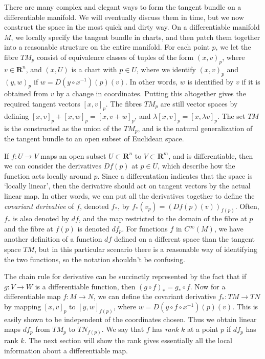 There are many complex and elegant ways to form the tangent bundle on a differentiable manifold. We will eventually discuss them in time, but we now construct the space in the most quick and dirty way. On a differentiable manifold $M$, we locally specify the tangent bundle in charts, and then patch them together into a reasonable structure on the entire manifold. For each point $p$, we let the fibre $TM_p$ consist of equivalence classes of tuples of the form $(x,v)_p$, where $v \in \mathbf{R}^n$, and $(x,U)$ is a chart with $p \in U$, where we identify $(x,v)_p$ and $(y,w)_p$ if $w = D(y \circ x^{-1})(p)(v)$. In other words, $w$ is identified by $v$ if it is obtained from $v$ by a change in coordinates. Putting this altogether gives the required tangent vectors $[x,v]_p$. The fibres $TM_p$ are still vector spaces by defining $[x,v]_p + [x,w]_p = [x,v+w]_p$, and $\lambda [x,v]_p = [x,\lambda v]_p$. The set $TM$ is the constructed as the union of the $TM_p$, and is the natural generalization of the tangent bundle to an open subset of Euclidean space.

If $f: U \to V$ maps an open subset $U \subset \mathbf{R}^n$ to $V \subset \mathbf{R}^m$, and is differentiable, then we can consider the derivatives $Df(p)$ at $p \in U$, which describe how the function acts locally around $p$. Since a differentation indicates that the space is `locally linear', then the derivative should act on tangent vectors by the actual linear map. In other words, we can put all the derivatives together to define the \emph{covariant derivative} of $f$, denoted $f_*$, by $f_*(v_p) = (Df(p)(v))_{f(p)}$. Often, $f_*$ is also denoted by $df$, and the map restricted to the domain of the fibre at $p$ and the fibre at $f(p)$ is denoted $df_p$. For functions $f$ in $C^\infty(M)$, we have another definition of a function $df$ defined on a different space than the tangent space $TM$, but in this particular scenario there is a reasonable way of identifying the two functions, so the notation shouldn't be confusing.

The chain rule for derivative can be succinctly represented by the fact that if $g: V \to W$ is a differentiable function, then $(g \circ f)_* = g_* \circ f$. Now for a differentiable map $f: M \to N$, we can define the covariant derivative $f_*: TM \to TN$ by mapping $[x,v]_p$ to $[y,w]_{f(p)}$, where $w = D(y \circ f \circ x^{-1})(p)(v)$. This is easily shown to be independent of the coordinates chosen. Thus we obtain linear maps $df_p$ from $TM_p$ to $TN_{f(p)}$. We say that $f$ has \emph{rank $k$} at a point $p$ if $df_p$ has rank $k$. The next section will show the rank gives essentially all the local information about a differentiable map.

